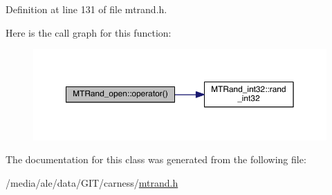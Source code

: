 Definition at line 131 of file mtrand.\-h.



Here is the call graph for this function\-:\nopagebreak
\begin{figure}[H]
\begin{center}
\leavevmode
\includegraphics[width=346pt]{a00020_ac408aa400ca59fc2afc888d88f98d807_cgraph}
\end{center}
\end{figure}




The documentation for this class was generated from the following file\-:\begin{DoxyCompactItemize}
\item 
/media/ale/data/\-G\-I\-T/carness/\hyperlink{a00041}{mtrand.\-h}\end{DoxyCompactItemize}
